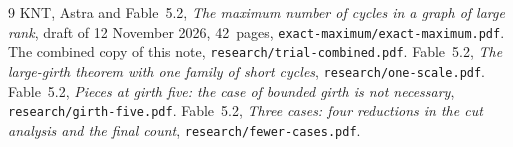 \documentclass[11pt]{article}
\begin{document}
\begin{thebibliography}{9}\small
{} KNT, Astra and Fable~5.2, \emph{The maximum number of cycles in a graph of large
rank}, draft of 12 November 2026, 42~pages, \texttt{exact-maximum/exact-maximum.pdf}.
 The combined copy of this note, \texttt{research/trial-combined.pdf}.
 Fable~5.2, \emph{The large-girth theorem with one family of short cycles},
\texttt{research/one-scale.pdf}.
 Fable~5.2, \emph{Pieces at girth five: the case of bounded girth is not
necessary}, \texttt{research/girth-five.pdf}.
 Fable~5.2, \emph{Three cases: four reductions in the cut analysis and the final
count}, \texttt{research/fewer-cases.pdf}.
\end{thebibliography}
\end{document}

